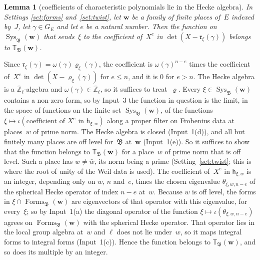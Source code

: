 \documentclass[11pt,a4paper]{article}
\makeatletter
\newcommand{\lean}[1]{\csname LN@#1\endcsname}
\newcommand{\m}[1]{\mbox{$#1$}}        %
\newcommand{\leantag}{{\sffamily\bfseries\fontsize{6.3}{8}\selectfont\color{leancol}\addfontfeatures{LetterSpace=7}LEAN}}
\newcommand{\leanline}[1]{\par\nopagebreak\vspace{-2.5pt}{\fontsize{8.9}{12.4}\selectfont\color{inksoft}\raggedright
  \noindent\llap{\leantag\hspace{9pt}}#1\par}\vspace{1pt}}
\theoremstyle{plainx}
\newtheorem{lemma}[theorem]{Lemma}
\theoremstyle{uprightx}
\renewenvironment{proof}[1][Proof]{\par\pushQED{\qed}\normalfont\topsep0pt\partopsep0pt
  \trivlist\item[\hskip\labelsep\itshape #1.]\ignorespaces}{\popQED\endtrivlist\@endpefalse}
\newcommand{\Zl}{\bar{\mathbb{Z}}_\ell}
\newcommand{\GE}{G_E}
\newcommand{\Forms}{\operatorname{Forms}}
\newcommand{\Sys}{\operatorname{Sys}}
\newcommand{\Hk}{\mathbb{T}}
\newcommand{\hp}[2]{\mathsf{h}_{#1,#2}}
\newcommand{\fB}{\mathfrak{B}}
\newcommand{\rr}{\mathfrak{r}}
\newcommand{\bw}{\mathbf{w}}
\makeatother
\begin{document}
\begin{lemma}[coefficients of characteristic polynomials lie in the Hecke algebra]\label{l:charpoly}
In Settings \ref{set:forms} and~\ref{set:twist}, let $\bw$ be a family of finite places of~$E$ indexed by~$J$, let
\m{\gamma\in\GE} and let $e$ be a natural number. Then the function on \m{\Sys_{\fB}(\bw)} that sends~$\xi$ to the
coefficient of~$X^e$ in \m{\det(X-\rr_\xi(\gamma))} belongs to \m{\Hk_{\fB}(\bw)}.
\end{lemma}
\begin{proof}
Since \m{\rr_\xi(\gamma)=\omega(\gamma)\varrho_\xi(\gamma)}, the coefficient is \m{\omega(\gamma)^{n-e}} times the
coefficient of~$X^e$ in \m{\det(X-\varrho_\xi(\gamma))} for \m{e\le n}, and it is $0$ for \m{e>n}. The Hecke algebra
is a $\Zl$-algebra and \m{\omega(\gamma)\in\Zl}, so it suffices to treat~\m{\varrho}. Every
\m{\xi\in\Sys_{\fB}(\bw)} contains a non-zero form, so by Input~3 the function in question is the limit, in the
space of functions on the finite set \m{\Sys_{\fB}(\bw)}, of the functions
\m{\xi\mapsto\iota(\text{coefficient of }X^e\text{ in }\hp{\xi}{w})} along a proper filter on Frobenius data at
places~$w$ of prime norm. The Hecke algebra is closed (Input~1(d)), and all but finitely many places are off level
for~$\fB$ at~$\bw$ (Input~1(e)). So it suffices to show that the function belongs to \m{\Hk_{\fB}(\bw)} for a
place~$w$ of prime norm that is off level. Such a place has \m{w\ne\bar w}, its norm being a prime
(Setting~\ref{set:twist}; this is where the root of unity of the Weil data is used). The coefficient of~$X^e$ in
\m{\hp{\xi}{w}} is an integer, depending only on $w$, $n$ and~$e$, times the chosen eigenvalue
\m{\theta_{\xi,w,n-e}} of the spherical Hecke operator of index \m{n-e} at~$w$. Because $w$ is off level, the forms
in \m{\xi\cap\Forms_{\fB}(\bw)} are eigenvectors of that operator with this eigenvalue, for every~$\xi$; so by
Input~1(a) the diagonal operator of the function \m{\xi\mapsto\iota(\theta_{\xi,w,n-e})} agrees on
\m{\Forms_{\fB}(\bw)} with the spherical Hecke operator. That operator lies in the local group algebra at~$w$ and
$\ell$ does not lie under~$w$, so it maps integral forms to integral forms (Input~1(c)). Hence the function
belongs to \m{\Hk_{\fB}(\bw)}, and so does its multiple by an integer.
\end{proof}
\leanline{\lean{charpolyMem}}
\end{document}
